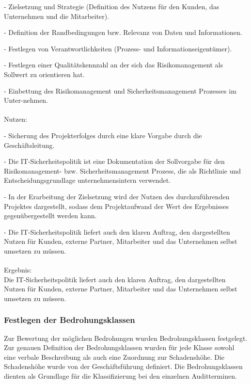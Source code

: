 - Zielsetzung und Strategie (Definition des Nutzens für den Kunden, das Unternehmen und die Mitarbeiter).

- Definition der Randbedingungen bzw. Relevanz von Daten und Informationen.

- Festlegen von Verantwortlichkeiten (Prozess- und Informationseigentümer).

- Festlegen einer Qualitätskennzahl an der sich das Risikomanagement als Sollwert zu orientieren hat.

- Einbettung des Risikomanagement und Sicherheitsmanagement Prozesses im Unter-nehmen.
\\
\\
Nutzen:

- Sicherung des Projekterfolges durch eine klare Vorgabe durch die Geschäftsleitung.

- Die IT-Sicherheitspolitik ist eine Dokumentation der Sollvorgabe für den Risikomanagement- bzw. Sicherheitsmanagement Prozess, die als Richtlinie und Entscheidungsgrundlage unternehmensintern verwendet.

- In der Erarbeitung der Zielsetzung wird der Nutzen des durchzuführenden Projektes dargestellt, sodass dem Projektaufwand der Wert des Ergebnisses gegenübergestellt werden kann.

- Die IT-Sicherheitspolitik liefert auch den klaren Auftrag, den dargestellten Nutzen für Kunden, externe Partner, Mitarbeiter und das Unternehmen selbst umsetzen zu müssen.
\\
\\
Ergebnis:\\
Die IT-Sicherheitspolitik liefert auch den klaren Auftrag, den dargestellten Nutzen für Kunden, externe Partner, Mitarbeiter und das Unternehmen selbst umsetzen zu müssen.

\subsubsection {Festlegen der Bedrohungsklassen}
Zur Bewertung der möglichen Bedrohungen wurden Bedrohungsklassen festgelegt. Zur genauen Definition der Bedrohungsklassen wurden für jede Klasse sowohl eine verbale Beschreibung als auch eine Zuordnung zur Schadenshöhe. Die Schadenshöhe wurde von der Geschäftsführung definiert. Die Bedrohungsklassen dienten als Grundlage für die Klassifizierung bei den einzelnen Auditterminen.
